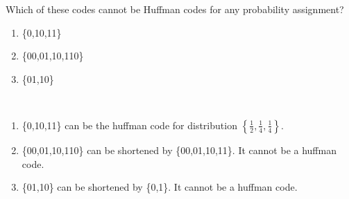 \begin{exercise}{ Which of these codes cannot be Huffman codes for any probability assignment?
  \begin{enumerate}
    \item \{0,10,11\}
    \item \{00,01,10,110\}
    \item \{01,10\}
  \end{enumerate}
  }
  \begin{solution}
  \par{~}
  \begin{enumerate}
    \item { \{0,10,11\} can be the huffman code for distribution $\left\{\frac{1}{2},\frac{1}{4},\frac{1}{4}\right\}$.
    }
    \item { \{00,01,10,110\} can be shortened by \{00,01,10,11\}. It cannot be a huffman code. 

    }
    \item { \{01,10\} can be shortened by \{0,1\}. It cannot be a huffman code.

    }
  \end{enumerate}
  \end{solution}
  \label{ex5-5}
\end{exercise}

